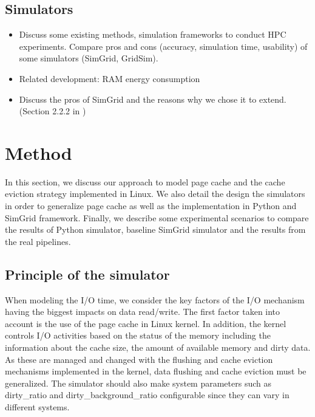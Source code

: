 \documentclass[conference]{IEEEtran}
\begin{document}
		\subsection{Simulators}
			\begin{itemize}
				\item Discuss some existing methods, simulation frameworks to conduct HPC experiments. Compare pros and cons (accuracy, simulation time, usability) of some simulators (SimGrid, GridSim).
				\item Related development: RAM energy consumption \cite{gill2019} \cite{ouarnoughi2017} 
				\item Discuss the pros of SimGrid and the reasons why we chose it to extend. (Section 2.2.2 in \cite{casanova2014})
			\end{itemize}
			
	\section{Method}
		In this section, we discuss our approach to model page cache and the cache eviction strategy implemented in Linux. We also detail the design the simulators in order to generalize page cache as well as the implementation in Python and SimGrid framework. Finally, we describe some experimental scenarios to compare the results of Python simulator, baseline SimGrid simulator and the results from the real pipelines.
		\subsection{Principle of the simulator}
	
			When modeling the I/O time, we consider the key factors of the I/O mechanism having the biggest impacts on data read/write. The first factor taken into account is the use of the page cache in Linux kernel. In addition, the kernel controls I/O activities based on the status of the memory including the information about the cache size, the amount of available memory and dirty data. As these are managed and changed with the flushing and cache eviction mechanisms implemented in the kernel, data flushing and cache eviction must be generalized. The simulator should also make system parameters such as dirty{\_}ratio and dirty{\_}background{\_}ratio configurable since they can vary in different systems.
			
\end{document}

